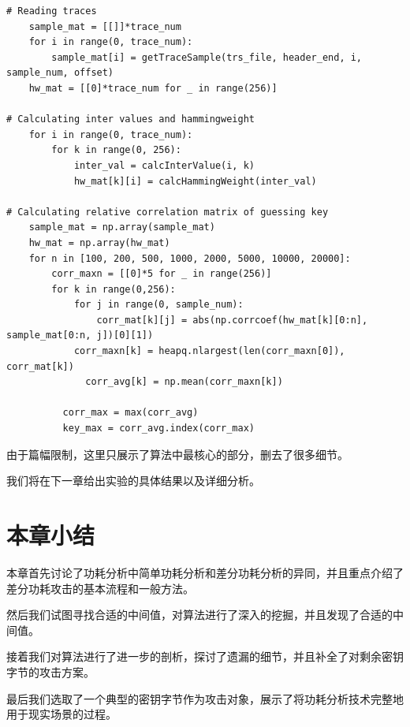 \begin{lstlisting}[style=myPython,label={lst:whole_attack},caption={功耗分析攻击的完整流程}]
# Reading traces
    sample_mat = [[]]*trace_num
    for i in range(0, trace_num):
        sample_mat[i] = getTraceSample(trs_file, header_end, i, sample_num, offset)
    hw_mat = [[0]*trace_num for _ in range(256)]

# Calculating inter values and hammingweight
    for i in range(0, trace_num):
        for k in range(0, 256):
            inter_val = calcInterValue(i, k)
            hw_mat[k][i] = calcHammingWeight(inter_val)

# Calculating relative correlation matrix of guessing key
    sample_mat = np.array(sample_mat)
    hw_mat = np.array(hw_mat)
    for n in [100, 200, 500, 1000, 2000, 5000, 10000, 20000]:
        corr_maxn = [[0]*5 for _ in range(256)]
        for k in range(0,256):
            for j in range(0, sample_num):
                corr_mat[k][j] = abs(np.corrcoef(hw_mat[k][0:n], sample_mat[0:n, j])[0][1])
            corr_maxn[k] = heapq.nlargest(len(corr_maxn[0]), corr_mat[k])
              corr_avg[k] = np.mean(corr_maxn[k])
  
          corr_max = max(corr_avg)
          key_max = corr_avg.index(corr_max)
\end{lstlisting}

由于篇幅限制，这里只展示了算法中最核心的部分，删去了很多细节。

我们将在下一章给出实验的具体结果以及详细分析。


\section{本章小结}


本章首先讨论了功耗分析中简单功耗分析和差分功耗分析的异同，并且重点介绍了差分功耗攻击的基本流程和一般方法。

然后我们试图寻找合适的中间值，对算法进行了深入的挖掘，并且发现了合适的中间值。

接着我们对算法进行了进一步的剖析，探讨了遗漏的细节，并且补全了对剩余密钥字节的攻击方案。

最后我们选取了一个典型的密钥字节作为攻击对象，展示了将功耗分析技术完整地用于现实场景的过程。
